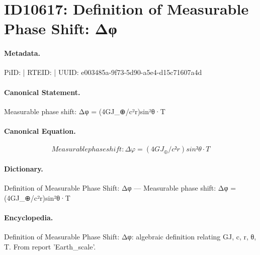 \section*{ID10617: Definition of Measurable Phase Shift: Δφ}
\paragraph{Metadata.}
PiID:  | RTEID:  | UUID: e003485a-9f73-5d90-a5e4-d15c71607a4d

\paragraph{Canonical Statement.}
Measurable phase shift: Δφ = (4GJ\_⊕/c²r)sin²θ·T

\paragraph{Canonical Equation.}
\[
Measurable phase shift: Δφ = (4GJ_⊕/c²r)sin²θ·T
\]

\paragraph{Dictionary.}
Definition of Measurable Phase Shift: Δφ — Measurable phase shift: Δφ = (4GJ\_⊕/c²r)sin²θ·T

\paragraph{Encyclopedia.}
Definition of Measurable Phase Shift: Δφ: algebraic definition relating GJ, c, r, θ, T. From report 'Earth\_scale'.
